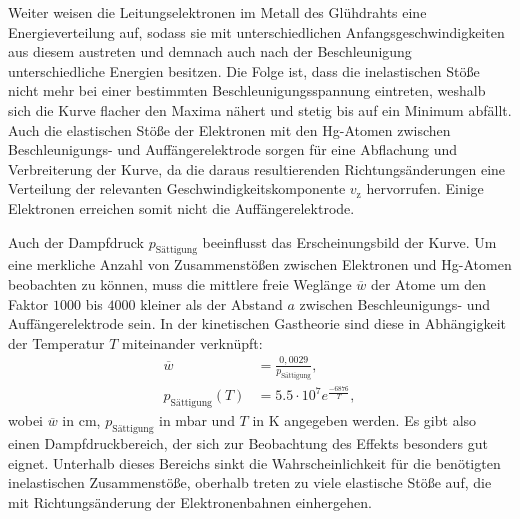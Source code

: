 Weiter weisen die Leitungselektronen im Metall des Glühdrahts eine Energieverteilung auf, 
sodass sie mit unterschiedlichen Anfangsgeschwindigkeiten aus diesem austreten und demnach
auch nach der Beschleunigung unterschiedliche Energien besitzen. Die Folge ist, dass die
inelastischen Stöße nicht mehr bei einer bestimmten Beschleunigungsspannung eintreten,
weshalb sich die Kurve flacher den Maxima nähert und stetig bis auf ein Minimum  abfällt.
Auch die elastischen Stöße der Elektronen mit den Hg-Atomen zwischen Beschleunigungs- und Auffängerelektrode
sorgen für eine Abflachung und Verbreiterung der Kurve, da die daraus resultierenden Richtungsänderungen
eine Verteilung der relevanten Geschwindigkeitskomponente $v_\text{z}$ hervorrufen. Einige
Elektronen erreichen somit nicht die Auffängerelektrode.

Auch der Dampfdruck $p_\text{Sättigung}$ beeinflusst das Erscheinungsbild der Kurve.
Um eine merkliche Anzahl von Zusammenstößen zwischen Elektronen und Hg-Atomen beobachten zu können,
muss die mittlere freie Weglänge $\overline{w}$ der Atome um den Faktor $1000$ bis $4000$
kleiner als der Abstand $a$ zwischen Beschleunigungs- und Auffängerelektrode sein.
In der kinetischen Gastheorie sind diese in Abhängigkeit der Temperatur $T$ miteinander verknüpft:
\begin{align}
\overline{w} &= \frac{0,0029}{p_\text{Sättigung}},\\
p_\text{Sättigung}(T) &= 5.5 \cdot 10^{7} e^{\frac{-6876}{T}},
\end{align}
wobei $\overline{w}$ in cm, $p_\text{Sättigung}$ in mbar und $T$ in K angegeben werden.
Es gibt also einen Dampfdruckbereich, der sich zur Beobachtung des Effekts besonders gut eignet.
Unterhalb dieses Bereichs sinkt die Wahrscheinlichkeit für die benötigten inelastischen Zusammenstöße,
oberhalb treten zu viele elastische Stöße auf, die mit Richtungsänderung der Elektronenbahnen
einhergehen.